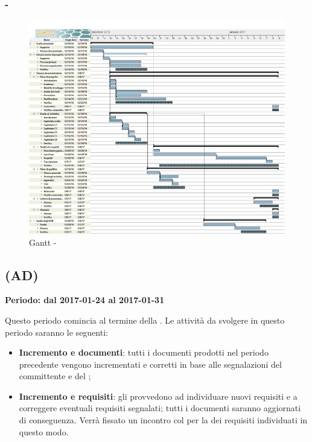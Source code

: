 \documentclass[./PianoDiProgetto.tex]{subfiles}
\begin{document}
  \subsubsection{ - \PerAR}
    \begin{figure}[!h]
    \centering
    \includegraphics[width=\textwidth]{images/AR}
    \caption{Gantt - \PerAR}
    \end{figure}
    
	\subsection{\PerAD{} (AD)}
  \textbf{Periodo: dal 2017-01-24 al 2017-01-31}

  Questo periodo comincia al termine della \PerAR.  Le attività da svolgere in questo periodo saranno le seguenti:
  \begin{itemize}
    \item \textbf{Incremento e  documenti}: tutti i documenti prodotti nel periodo precedente vengono incrementati e corretti in base alle segnalazioni del committente e del ;
    \item \textbf{Incremento e  requisiti}:  gli \ANP{} provvedono ad individuare nuovi requisiti e a correggere eventuali requisiti segnalati; tutti i documenti saranno aggiornati di conseguenza. Verrà fissato un incontro col  per la  dei requisiti individuati in questo modo.
\end{itemize}
\newpage
\end{document}
